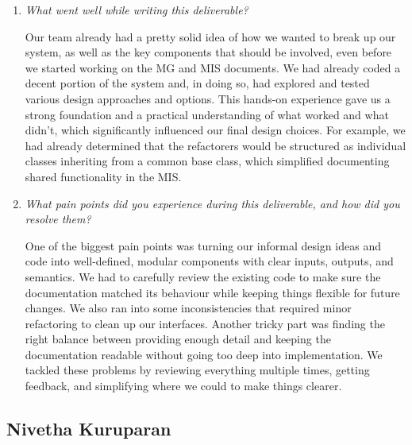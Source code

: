 \documentclass[12pt, titlepage]{article}
\begin{document}
\begin{enumerate}
  \item \textit{What went well while writing this deliverable? }

  Our team already had a pretty solid idea of how we wanted to break up our system, as well as the key components that should be involved, even before we started working on the MG and MIS documents. We had already coded a decent portion of the system and, in doing so, had explored and tested various design approaches and options. This hands-on experience gave us a strong foundation and a practical understanding of what worked and what didn't, which significantly influenced our final design choices. For example, we had already determined that the refactorers would be structured as individual classes inheriting from a common base class, which simplified documenting shared functionality in the MIS.

  \item \textit{What pain points did you experience during this deliverable, and how did you resolve them?}
  
  One of the biggest pain points was turning our informal design ideas and code into well-defined, modular components with clear inputs, outputs, and semantics. We had to carefully review the existing code to make sure the documentation matched its behaviour while keeping things flexible for future changes. We also ran into some inconsistencies that required minor refactoring to clean up our interfaces. Another tricky part was finding the right balance between providing enough detail and keeping the documentation readable without going too deep into implementation. We tackled these problems by reviewing everything multiple times, getting feedback, and simplifying where we could to make things clearer.

\end{enumerate}

\subsection*{Nivetha Kuruparan}
\end{document}
